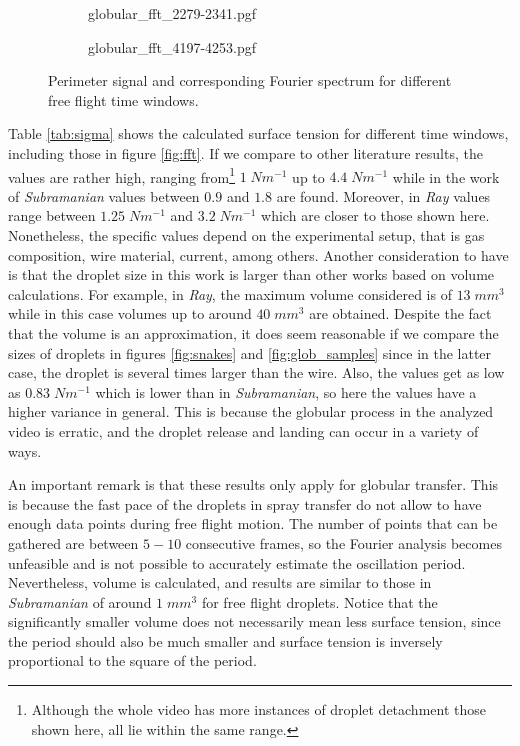 \begin{figure}
\centering
    \ContinuedFloat
    \captionsetup{list=off,format=cont}
  \begin{subfigure}[b]{\textwidth}
    {globular_fft_2279-2341.pgf}
  \end{subfigure}
\vfill
  \begin{subfigure}[b]{\textwidth}
    {globular_fft_4197-4253.pgf}
  \end{subfigure}
\caption[Perimeter signal and corresponding Fourier spectrum for different free flight time windows]{Perimeter signal and corresponding Fourier spectrum for different free flight time windows.}
\end{figure}

Table \ref{tab:sigma} shows the calculated surface tension for different time windows, including those in figure \ref{fig:fft}. If we compare to other literature results, the values are rather high, ranging from\footnote{Although the whole video has more instances of droplet detachment those shown here, all lie within the same range.} $1\;Nm^{-1}$ up to $4.4\;Nm^{-1}$ while in the work of \textit{Subramanian} \cite{surface_tension} values between $0.9$ and $1.8$ are found. Moreover, in \textit{Ray} \cite{Ray} values range between $1.25\;Nm^{-1}$ and $3.2\;Nm^{-1}$ which are closer to those shown here. Nonetheless, the specific values depend on the experimental setup, that is gas composition, wire material, current, among others. Another consideration to have is that the droplet size in this work is larger than other works based on volume calculations. For example, in \textit{Ray}, the maximum volume considered is of $13\;mm^3$ while in this case volumes up to around $40\;mm^3$ are obtained. Despite the fact that the volume is an approximation, it does seem reasonable if we compare the sizes of droplets in figures \ref{fig:snakes} and \ref{fig:glob_samples} since in the latter case, the droplet is several times larger than the wire. Also, the values get as low as $0.83\;Nm^{-1}$ which is lower than in \textit{Subramanian}, so here the values have a higher variance in general. This is because the globular process in the analyzed video is erratic, and the droplet release and landing can occur in a variety of ways. 

An important remark is that these results only apply for globular transfer. This is because the fast pace of the droplets in spray transfer do not allow to have enough data points during free flight motion. The number of points that can be gathered are between $5-10$ consecutive frames, so the Fourier analysis becomes unfeasible and is not possible to accurately estimate the oscillation period. Nevertheless, volume is calculated, and results are similar to those in \textit{Subramanian} \cite{surface_tension} of around $1\;mm^3$ for free flight droplets. Notice that the significantly smaller volume does not necessarily mean less surface tension, since the period should also be much smaller and surface tension is inversely proportional to the square of the period.


